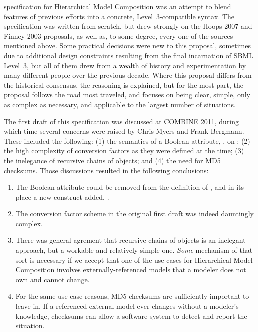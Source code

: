  specification for Hierarchical Model Composition was an attempt to blend features of previous efforts into a concrete, Level~3-compatible syntax.  The specification was written from scratch, but drew strongly on the Hoops 2007 and Finney 2003 proposals, as well as, to some degree, every one of the sources mentioned above. Some practical decisions were new to this proposal, sometimes due to additional design constraints resulting from the final incarnation of SBML Level~3, but all of them drew from a wealth of history and experimentation by many different people over the previous decade.  Where this proposal differs from the historical consensus, the reasoning is explained, but for the most part, the proposal follows the road most traveled, and focuses on being clear, simple, only as complex as necessary, and applicable to the largest number of situations.

The first draft of this specification was discussed at COMBINE 2011, during which time several concerns were raised by Chris Myers and Frank Bergmann.  These included the following: (1) the semantics of a Boolean attribute, , on \ReplacedElement; (2) the high complexity of conversion factors as they were defined at the time; (3) the inelegance of recursive chains of \SBaseRef objects; and (4) the need for MD5 checksums.  Those discussions resulted in the following conclusions:

\begin{enumerate}

\item The Boolean attribute  could be removed from the definition of \ReplacedElement, and in its place a new construct added, \ReplacedBy.

\item The conversion factor scheme in the original first draft was indeed dauntingly complex.

\item There was general agrement that recursive chains of \SBaseRef objects is an inelegant approach, but a workable and relatively simple one.  \emph{Some} mechanism of that sort is necessary if we accept that one of the use cases for Hierarchical Model Composition involves externally-referenced models that a modeler does not own and cannot change.

\item For the same use case reasons, MD5 checksums are sufficiently important to leave in.  If a referenced external model ever changes without a modeler's knowledge, checksums can allow a software system to detect and report the situation.

\end{enumerate}

